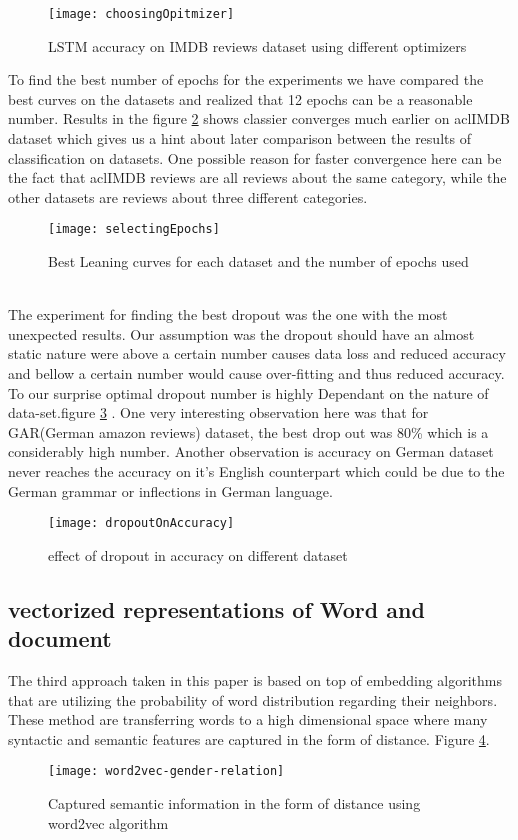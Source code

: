 	\begin{figure}
		\centering
		\texttt{[image: choosingOpitmizer]}
		\caption{LSTM accuracy on IMDB reviews dataset using different optimizers}
		\label{fig:choosingOpitmizer}
	\end{figure}
	To find the best number of epochs for the experiments we have compared the best curves on the datasets and realized that 12 epochs can be a reasonable number. Results in the  figure \ref{fig:selectingEpochs} shows classier converges much earlier on aclIMDB dataset which gives us a hint about later comparison between the results of classification on datasets. One possible reason for faster convergence here can be the fact that aclIMDB reviews are all reviews about the same category, while the other datasets are reviews about three different categories.
		\begin{figure}
			\centering
			\texttt{[image: selectingEpochs]}
			\caption{Best Leaning curves for each dataset and the number of epochs used }
			\label{fig:selectingEpochs}
		\end{figure}\\
	The experiment for finding the best dropout was the one with the most unexpected results. Our assumption was the dropout should have an almost static nature were above a certain number causes data loss and reduced accuracy and bellow a certain number would cause over-fitting and thus reduced accuracy. To our surprise optimal dropout number is highly Dependant on the nature of data-set.figure \ref{fig:dropoutOnAccuracy} .
	One very interesting observation here was that for GAR(German amazon reviews) dataset, the best drop out was 80\% which is a considerably high number. Another observation is accuracy on German dataset never reaches the accuracy on it's English counterpart which could be due to the German grammar or inflections in German language.
		\begin{figure}
			\centering
			\texttt{[image: dropoutOnAccuracy]}
			\caption{effect of dropout in accuracy on different dataset}
			\label{fig:dropoutOnAccuracy}
		\end{figure}
	\subsection*{vectorized representations of Word and document} 
	The third approach taken in this paper is based on top of embedding algorithms that are utilizing the probability of word distribution regarding their neighbors. These method are transferring words to a high dimensional space where many syntactic and semantic features are captured in the form of distance\cite{explainW2V}. Figure \ref{fig:word2vec-gender-relation}.
	\begin{figure}
		\centering
		\texttt{[image: word2vec-gender-relation]}
		\caption{Captured semantic information in the form of distance using word2vec algorithm}
		\label{fig:word2vec-gender-relation}
	\end{figure}
	
